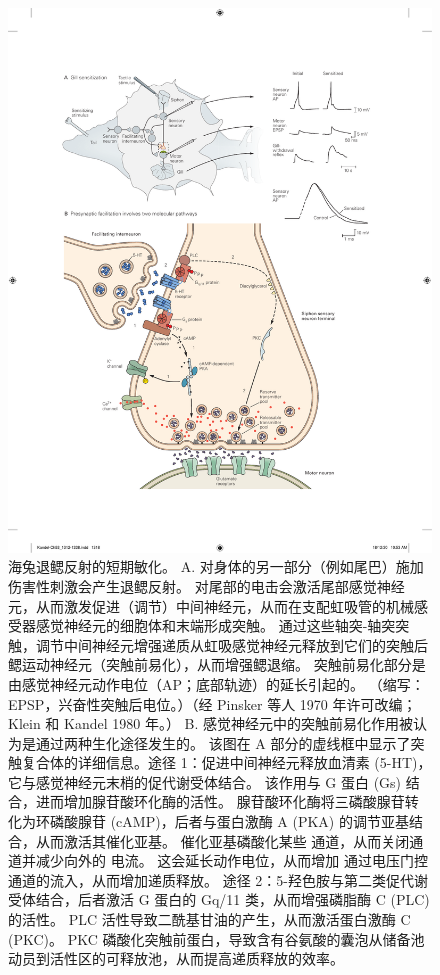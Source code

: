 \begin{figure}[htbp]
	\centering
	\includegraphics[width=0.9\linewidth]{chap53/fig_53_4}
	\caption{海兔退鳃反射的短期敏化。 A. 对身体的另一部分（例如尾巴）施加伤害性刺激会产生退鳃反射。 对尾部的电击会激活尾部感觉神经元，从而激发促进（调节）中间神经元，从而在支配虹吸管的机械感受器感觉神经元的细胞体和末端形成突触。 通过这些轴突-轴突突触，调节中间神经元增强递质从虹吸感觉神经元释放到它们的突触后鳃运动神经元（突触前易化），从而增强鳃退缩。 突触前易化部分是由感觉神经元动作电位（AP；底部轨迹）的延长引起的。 （缩写：EPSP，兴奋性突触后电位。）（经 Pinsker 等人 1970 年许可改编；Klein 和 Kandel 1980 年。） B. 感觉神经元中的突触前易化作用被认为是通过两种生化途径发生的。 该图在 A 部分的虚线框中显示了突触复合体的详细信息。途径 1：促进中间神经元释放血清素 (5-HT)，它与感觉神经元末梢的促代谢受体结合。 该作用与 G 蛋白 (Gs) 结合，进而增加腺苷酸环化酶的活性。 腺苷酸环化酶将三磷酸腺苷转化为环磷酸腺苷 (cAMP)，后者与蛋白激酶 A (PKA) 的调节亚基结合，从而激活其催化亚基。 催化亚基磷酸化某些  通道，从而关闭通道并减少向外的  电流。 这会延长动作电位，从而增加  通过电压门控  通道的流入，从而增加递质释放。 途径 2：5-羟色胺与第二类促代谢受体结合，后者激活 G 蛋白的 Gq/11 类，从而增强磷脂酶 C (PLC) 的活性。 PLC 活性导致二酰基甘油的产生，从而激活蛋白激酶 C (PKC)。 PKC 磷酸化突触前蛋白，导致含有谷氨酸的囊泡从储备池动员到活性区的可释放池，从而提高递质释放的效率。}
	\label{fig:53_4}
\end{figure}


